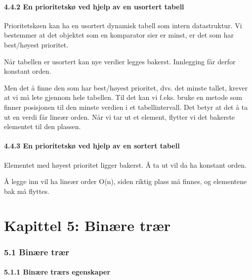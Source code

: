 \documentclass[11pt]{article}
\begin{document}
    \subsection{4.4.2 En prioritetskø ved hjelp av en usortert tabell}
        Prioritetskøen kan ha en usortert dynamisk tabell som intern datastruktur. Vi bestemmer at
        det objektet som en komparator sier er minst, er det som har best/høyest prioritet.

        Når tabellen er usortert kan nye verdier legges bakerst. Innlegging får derfor
        konstant orden. 

        Men det å finne den som har best/høyest prioritet, dvs. det minste tallet, krever at vi må lete
        gjennom hele tabellen. Til det kan vi f.eks. bruke en metode som finner posisjonen til den
        minste verdien i et tabellintervall. Det betyr at det å ta ut en verdi får lineær orden. Når vi tar ut et element,
        flytter vi det bakerste elementet til den plassen.

    \subsection{4.4.3 En prioritetskø ved hjelp av en sortert tabell}
        Elementet med høyest prioritet ligger bakerst. Å ta ut vil da ha konstant orden.

        Å legge inn vil ha lineær order O(n), siden riktig plass må finnes, og elementene bak må flyttes.

\newpage
\part{Kapittel 5: Binære trær}

\section{5.1 Binære trær}
    \subsection{5.1.1 Binære trærs egenskaper}
\end{document}
